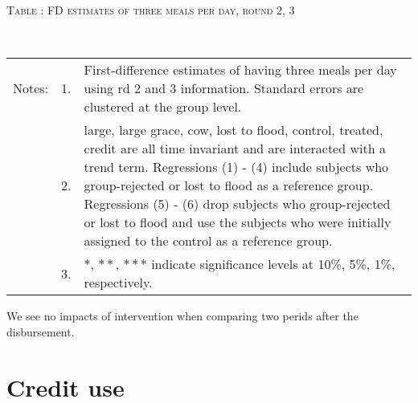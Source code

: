 \begin{table}
\hfil\textsc{\footnotesize Table \thetable: FD estimates of three meals per day, round 2, 3\label{FD3meals}}\\
\setlength{\tabcolsep}{1pt}
\renewcommand{\arraystretch}{.6}
\hfil{}\\
\renewcommand{\arraystretch}{1}

\vspace{-4ex}
\hfil\begin{tabular}{>{\hfill\scriptsize}p{1cm}<{}>{\hfill\scriptsize}p{.25cm}<{}>{\scriptsize}p{11.5cm}<{\hfill}}
Notes:& 1. & First-difference estimates of having three meals per day using rd 2 and 3 information. Standard errors are clustered at the group level.\\[-1ex]
& 2. & \textsf{large, large grace, cow, lost to flood, control, treated, credit} are all time invariant and are interacted with a trend term. 
Regressions (1) - (4) include subjects who group-rejected or lost to flood as a reference group. Regressions (5) - (6) drop subjects who group-rejected or lost to flood and use the subjects who were initially assigned to the control as a reference group.\\
& 3. & $*$, $**$, $***$ indicate significance levels at 10\%, 5\%, 1\%, respectively.\\
\end{tabular}
\end{table}

We see no impacts of intervention when comparing two perids after the disbursement. 

\section{Credit use}

